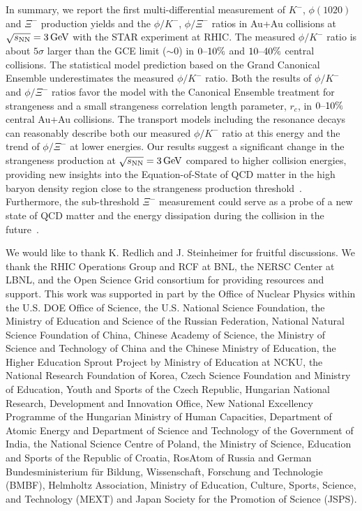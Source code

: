 \documentclass[%
 reprint,	
showpacs,
 amsmath,amssymb,
 aps,
 superscriptaddress,
]{revtex4-1}
\begin{document}
In summary, we report the first multi-differential measurement of $K^-$, $\phi(1020)$ and $\Xi^{-}$ production yields  and the $\phi/K^-$, $\phi/\Xi^-$ ratios in Au+Au collisions at ${\sqrt{s_{\rm NN}} = \rm{3\,GeV}}$ with the STAR experiment at RHIC. The measured $\phi/K^-$ ratio is about $5\sigma$ larger than the GCE limit ($\sim$0) in $\textup{0--10\%}$ and $\textup{10--40\%}$ central collisions. The statistical model prediction based on the Grand Canonical Ensemble underestimates the measured $\phi/K^-$ ratio. Both the results of $\phi/K^-$ and $\phi/\Xi^-$ ratios favor the model with the Canonical Ensemble treatment for strangeness and a small strangeness correlation length parameter, $r_c$, in $\textup{0--10\%}$ central Au+Au collisions. The transport models including the resonance decays can reasonably describe both our measured $\phi/K^-$ ratio at this energy and the trend of $\phi/\Xi^-$ at lower energies. Our results suggest a significant change in the strangeness production at ${\sqrt{s_{\rm NN}} = \rm{3\,GeV}}$ compared to higher collision energies, providing new insights into the Equation-of-State of QCD matter in the high baryon density region close to the strangeness production threshold~\cite{KO_sQM17}. Furthermore, the sub-threshold $\Xi^-$ measurement could serve as a probe of a new state of QCD matter and the energy dissipation during the collision in the future~\cite{yong2021double,Ks0_Lambda_HADES}. 



We would like to thank K. Redlich and J. Steinheimer for fruitful discussions.
We thank the RHIC Operations Group and RCF at BNL, the NERSC Center at LBNL, and the Open Science Grid consortium for providing resources and support.  This work was supported in part by the Office of Nuclear Physics within the U.S. DOE Office of Science, the U.S. National Science Foundation, the Ministry of Education and Science of the Russian Federation, National Natural Science Foundation of China, Chinese Academy of Science, the Ministry of Science and Technology of China and the Chinese Ministry of Education, the Higher Education Sprout Project by Ministry of Education at NCKU, the National Research Foundation of Korea, Czech Science Foundation and Ministry of Education, Youth and Sports of the Czech Republic, Hungarian National Research, Development and Innovation Office, New National Excellency Programme of the Hungarian Ministry of Human Capacities, Department of Atomic Energy and Department of Science and Technology of the Government of India, the National Science Centre of Poland, the Ministry  of Science, Education and Sports of the Republic of Croatia, RosAtom of Russia and German Bundesministerium f\"ur Bildung, Wissenschaft, Forschung and Technologie (BMBF), Helmholtz Association, Ministry of Education, Culture, Sports, Science, and Technology (MEXT) and Japan Society for the Promotion of Science (JSPS).


\end{document}
